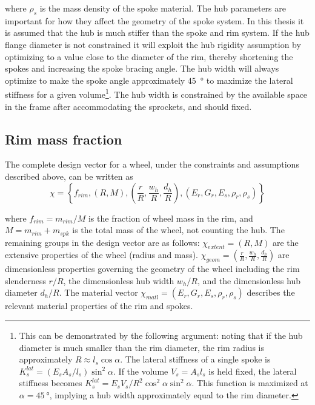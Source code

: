 \documentclass[\rootdir/thesis.tex]{subfiles}
\begin{document}
where $\rho_s$ is the mass density of the spoke material. The hub parameters are important for how they affect the geometry of the spoke system. In this thesis it is assumed that the hub is much stiffer than the spoke and rim system. If the hub flange diameter is not constrained it will exploit the hub rigidity assumption by optimizing to a value close to the diameter of the rim, thereby shortening the spokes and increasing the spoke bracing angle. The hub width will always optimize to make the spoke angle approximately \SI{45}{\degree} to maximize the lateral stiffness for a given volume\footnote{This can be demonstrated by the following argument: noting that if the hub diameter is much smaller than the rim diameter, the rim radius is approximately $R \approx l_s \cos{\alpha}$. The lateral stiffness of a single spoke is $K_s^{lat} = (E_sA_s/l_s)\sin^2{\alpha}$. If the volume $V_s=A_sl_s$ is held fixed, the lateral stiffness becomes $K_s^{lat} = E_sV_s/R^2 \cos^2{\alpha}\sin^2{\alpha}$. This function is maximized at $\alpha=\SI{45}{\degree}$, implying a hub width approximately equal to the rim diameter.}. The hub width is constrained by the available space in the frame after accommodating the sprockets, and should fixed.

\subsection{Rim mass fraction}

The complete design vector for a wheel, under the constraints and assumptions described above, can be written as
\begin{equation}
\label{eqn:design_vector}
\chi = \left\lbrace f_{rim}, (R, M), \left(\frac{r}{R}, \frac{w_h}{R}, \frac{d_h}{R}\right), (E_r, G_r, E_s, \rho_r, \rho_s) \right\rbrace
\end{equation}

where $f_{rim} = m_{rim}/M$ is the fraction of wheel mass in the rim, and $M=m_{rim} + m_{spk}$ is the total mass of the wheel, not counting the hub. The remaining groups in the design vector are as follows: $\chi_{extent}=(R, M)$ are the extensive properties of the wheel (radius and mass). $\chi_{geom} = \left(\frac{r}{R}, \frac{w_h}{R}, \frac{d_h}{R}\right)$ are dimensionless properties governing the geometry of the wheel including the rim slenderness $r/R$, the dimensionless hub width $w_h/R$, and the dimensionless hub diameter $d_h/R$. The material vector $\chi_{matl}= (E_r, G_r, E_s, \rho_r, \rho_s)$ describes the relevant material properties of the rim and spokes.
\end{document}
